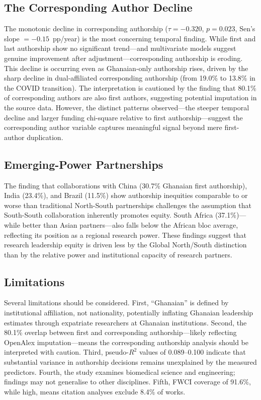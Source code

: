 \documentclass[12pt, a4paper]{article}
\begin{document}
\subsection{The Corresponding Author Decline}

The monotonic decline in corresponding authorship ($\tau = -0.320$, $p = 0.023$, Sen's slope $= -0.15$~pp/year) is the most concerning temporal finding. While first and last authorship show no significant trend---and multivariate models suggest genuine improvement after adjustment---corresponding authorship is eroding. This decline is occurring even as Ghanaian-only authorship rises, driven by the sharp decline in dual-affiliated corresponding authorship (from 19.0\% to 13.8\% in the COVID transition). The interpretation is cautioned by the finding that 80.1\% of corresponding authors are also first authors, suggesting potential imputation in the source data. However, the distinct patterns observed---the steeper temporal decline and larger funding chi-square relative to first authorship---suggest the corresponding author variable captures meaningful signal beyond mere first-author duplication.

\subsection{Emerging-Power Partnerships}

The finding that collaborations with China (30.7\% Ghanaian first authorship), India (23.4\%), and Brazil (11.5\%) show authorship inequities comparable to or worse than traditional North-South partnerships challenges the assumption that South-South collaboration inherently promotes equity. South Africa (37.1\%)---while better than Asian partners---also falls below the African bloc average, reflecting its position as a regional research power. These findings suggest that research leadership equity is driven less by the Global North/South distinction than by the relative power and institutional capacity of research partners.

\subsection{Limitations}

Several limitations should be considered. First, ``Ghanaian'' is defined by institutional affiliation, not nationality, potentially inflating Ghanaian leadership estimates through expatriate researchers at Ghanaian institutions. Second, the 80.1\% overlap between first and corresponding authorship---likely reflecting OpenAlex imputation---means the corresponding authorship analysis should be interpreted with caution. Third, pseudo-$R^2$ values of 0.089--0.100 indicate that substantial variance in authorship decisions remains unexplained by the measured predictors. Fourth, the study examines biomedical science and engineering; findings may not generalise to other disciplines. Fifth, FWCI coverage of 91.6\%, while high, means citation analyses exclude 8.4\% of works.
\end{document}
